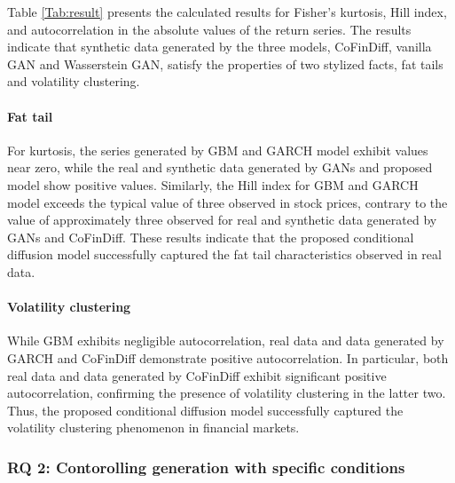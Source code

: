 \documentclass{article}
\begin{document}
Table \ref{Tab:result} presents the calculated results for Fisher's kurtosis, Hill index, and autocorrelation in the absolute values of the return series.
The results indicate that synthetic data generated by the three models, CoFinDiff, vanilla GAN and Wasserstein GAN, satisfy the properties of two stylized facts, fat tails and volatility clustering.

\paragraph{Fat tail}

For kurtosis, the series generated by GBM and GARCH model exhibit values near zero, while the real and synthetic data generated by GANs and proposed model show positive values. Similarly, the Hill index for GBM and GARCH model exceeds the typical value of three observed in stock prices, contrary to the value of approximately three observed for real and synthetic data generated by GANs and CoFinDiff. These results indicate that the proposed conditional diffusion model successfully captured the fat tail characteristics observed in real data.

\paragraph{Volatility clustering}

While GBM exhibits negligible autocorrelation, real data and data generated by GARCH and CoFinDiff demonstrate positive autocorrelation. In particular, both real data and data generated by CoFinDiff exhibit significant positive autocorrelation, confirming the presence of volatility clustering in the latter two. Thus, the proposed conditional diffusion model successfully captured the volatility clustering phenomenon in financial markets.

\subsubsection{RQ 2: Contorolling generation with specific conditions}
\end{document}
